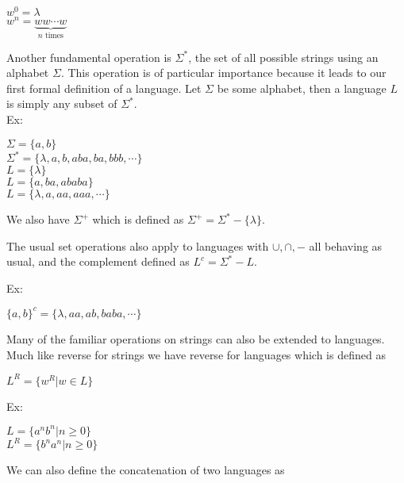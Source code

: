 \documentclass[11pt]{exam}
\begin{document}
\begin{center}
$w^0 = \lambda$\\
$w^n = \underbrace{ww \cdots w}_\text{$n$ times}$\\
\end{center}


Another fundamental operation is $\Sigma^*$, the set of all possible strings using an alphabet $\Sigma$. This operation is of particular importance because it leads to our first formal definition of a language. Let $\Sigma$ be some alphabet, then a language $L$ is simply any subset of $\Sigma^*$. \\ 

Ex:

\begin{center}
$\Sigma = \{a,b\}$\\
$\Sigma^* =  \{\lambda, a, b, aba, ba, bbb, \cdots \}$\\

$L = \{\lambda\}$\\
$L = \{a,ba,ababa\}$\\
$L = \{\lambda, a, aa, aaa, \cdots \}$\\
\end{center}

We also have $\Sigma^+$ which is defined as $\Sigma^+ =  \Sigma^* - \{\lambda\}$.

The usual set operations also apply to languages with $\cup, \cap, -$ all behaving as usual, and the complement defined as $L^c = \Sigma^* - L$.

Ex:
\begin{center}
$\{a,b\}^c = \{\lambda,aa,ab,baba, \cdots \}$\\
\end{center}

Many of the familiar operations on strings can also be extended to languages. Much like reverse for strings we have reverse for languages which is defined as

\begin{center}
$L^R = \{ w^R | w \in L \}$\\
\end{center}

Ex:

\begin{center}
$L = \{ a^nb^n | n \geq 0 \}$\\
$L^R = \{b^na^n | n \geq 0 \}$\\
\end{center}

We can also define the concatenation of two languages as 
\end{document}

